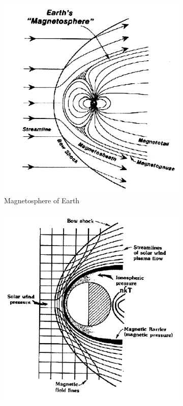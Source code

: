 \begin{figure}
\centering
\begin{subfigure}{.5\textwidth}
    \centering
    \includegraphics[width=\linewidth]{figures/EarthMagnetosphere.PNG}
    \caption{Magnetosphere of Earth}
    \label{fig:EarthMagSph}
\end{subfigure}%
\begin{subfigure}{.5\textwidth}
    \centering
    \includegraphics[width=\linewidth]{figures/inducedMagnetosphere.PNG}

\end{subfigure}
\end{figure}
